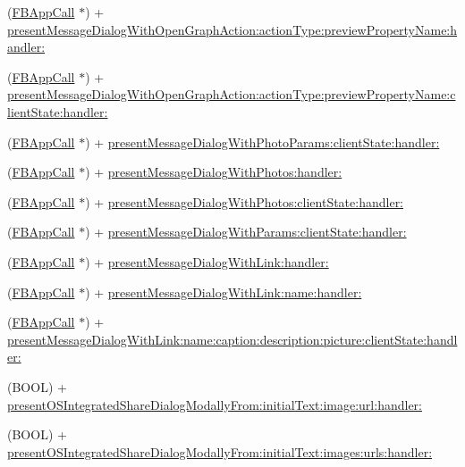 \begin{DoxyCompactItemize}
\item 
(\hyperlink{interfaceFBAppCall}{F\+B\+App\+Call} $\ast$) + \hyperlink{interfaceFBDialogs_a0f030b33a0565ec590e4abe56e147dc0}{present\+Message\+Dialog\+With\+Open\+Graph\+Action\+:action\+Type\+:preview\+Property\+Name\+:handler\+:}
\item 
(\hyperlink{interfaceFBAppCall}{F\+B\+App\+Call} $\ast$) + \hyperlink{interfaceFBDialogs_abcc422b112c828ff673681fbf4d7ccc1}{present\+Message\+Dialog\+With\+Open\+Graph\+Action\+:action\+Type\+:preview\+Property\+Name\+:client\+State\+:handler\+:}
\item 
(\hyperlink{interfaceFBAppCall}{F\+B\+App\+Call} $\ast$) + \hyperlink{interfaceFBDialogs_a4354b3266eb59fa77f04d88a4e6cda32}{present\+Message\+Dialog\+With\+Photo\+Params\+:client\+State\+:handler\+:}
\item 
(\hyperlink{interfaceFBAppCall}{F\+B\+App\+Call} $\ast$) + \hyperlink{interfaceFBDialogs_a47a8fb26e758e8b8da4843ce641a3fe6}{present\+Message\+Dialog\+With\+Photos\+:handler\+:}
\item 
(\hyperlink{interfaceFBAppCall}{F\+B\+App\+Call} $\ast$) + \hyperlink{interfaceFBDialogs_aa349cd5cb466439073782e084c422ca0}{present\+Message\+Dialog\+With\+Photos\+:client\+State\+:handler\+:}
\item 
(\hyperlink{interfaceFBAppCall}{F\+B\+App\+Call} $\ast$) + \hyperlink{interfaceFBDialogs_a09310f22ebc3ece7c91ee5bb47ccc4c6}{present\+Message\+Dialog\+With\+Params\+:client\+State\+:handler\+:}
\item 
(\hyperlink{interfaceFBAppCall}{F\+B\+App\+Call} $\ast$) + \hyperlink{interfaceFBDialogs_a33517c3089b65e7ce4c64c1c22c4e4af}{present\+Message\+Dialog\+With\+Link\+:handler\+:}
\item 
(\hyperlink{interfaceFBAppCall}{F\+B\+App\+Call} $\ast$) + \hyperlink{interfaceFBDialogs_ab32ff5073473c59f8ced776e087d5fe4}{present\+Message\+Dialog\+With\+Link\+:name\+:handler\+:}
\item 
(\hyperlink{interfaceFBAppCall}{F\+B\+App\+Call} $\ast$) + \hyperlink{interfaceFBDialogs_a6441b5e4b196ed9b32180aa14400c05a}{present\+Message\+Dialog\+With\+Link\+:name\+:caption\+:description\+:picture\+:client\+State\+:handler\+:}
\item 
(B\+O\+OL) + \hyperlink{interfaceFBDialogs_a872dc61b3ce463fea47eec224f8fb635}{present\+O\+S\+Integrated\+Share\+Dialog\+Modally\+From\+:initial\+Text\+:image\+:url\+:handler\+:}
\item 
(B\+O\+OL) + \hyperlink{interfaceFBDialogs_ac4ebf0c4beb5669aadce04ae3b8d8b2b}{present\+O\+S\+Integrated\+Share\+Dialog\+Modally\+From\+:initial\+Text\+:images\+:urls\+:handler\+:}

\end{DoxyCompactItemize}
